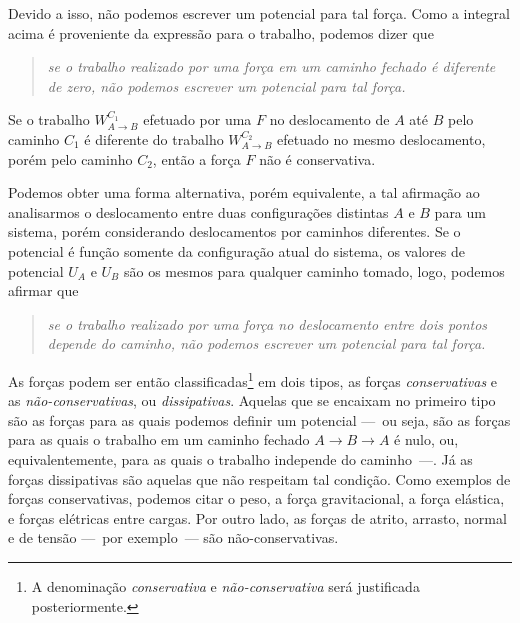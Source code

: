 \noindent{}Devido a isso, não podemos escrever um potencial para tal força. Como a integral acima é proveniente da expressão para o trabalho, podemos dizer que
\begin{quote}
\emph{se o trabalho realizado por uma força em um caminho fechado é diferente de zero, não podemos escrever um potencial para tal força.}
\end{quote}

\begin{marginfigure}
\centering
{}
\caption{Se o trabalho $W_{A\to B}^{C_1}$ efetuado por uma $F$ no deslocamento de $A$ até $B$ pelo caminho $C_1$ é diferente do trabalho $W_{A\to B}^{C_2}$ efetuado no mesmo deslocamento, porém pelo caminho $C_2$, então a força $F$ não é conservativa.}
\end{marginfigure}

Podemos obter uma forma alternativa, porém equivalente, a tal afirmação ao analisarmos o deslocamento entre duas configurações distintas $A$ e $B$ para um sistema, porém considerando deslocamentos por caminhos diferentes. Se o potencial é função somente da configuração atual do sistema, os valores de potencial $U_A$ e $U_B$ são os mesmos para qualquer caminho tomado, logo, podemos afirmar que
\begin{quote}
\emph{se o trabalho realizado por uma força no deslocamento entre dois pontos depende do caminho, não podemos escrever um potencial para tal força.}
\end{quote}

As forças podem ser então classificadas\footnote[][5mm]{A denominação \emph{conservativa} e \emph{não-conservativa} será justificada posteriormente.} em dois tipos, as forças \emph{conservativas} e as \emph{não-conservativas}, ou \emph{dissipativas}. Aquelas que se encaixam no primeiro tipo são as forças para as quais podemos definir um potencial ---~ou seja, são as forças para as quais o trabalho em um caminho fechado $A\to B\to A$ é nulo, ou, equivalentemente, para as quais o trabalho independe do caminho~---. Já as forças dissipativas são aquelas que não respeitam tal condição. Como exemplos de forças conservativas, podemos citar o peso, a força gravitacional, a força elástica, e forças elétricas entre cargas. Por outro lado, as forças de atrito, arrasto, normal e de tensão ---~por exemplo~--- são não-conservativas.

